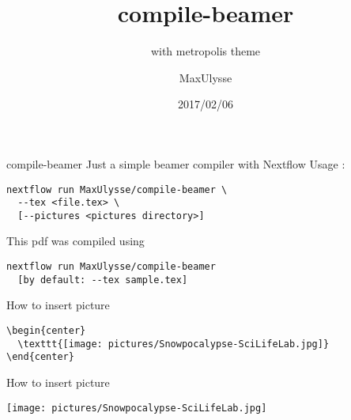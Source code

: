 \documentclass{beamer}
\title{compile-beamer}
\subtitle{with metropolis theme}
\author{MaxUlysse}
\institute{
	SciLifeLab\\
	\vfill\texttt{[image: pictures/SciLifeLab]}
}
\date{2017/02/06}
\begin{document}
\maketitle

\begin{frame}[fragile]{compile-beamer}
  Just a simple beamer compiler with Nextflow
  Usage :
  \begin{verbatim}
nextflow run MaxUlysse/compile-beamer \
  --tex <file.tex> \
  [--pictures <pictures directory>]
  \end{verbatim}
  This pdf was compiled using
  \begin{verbatim}
nextflow run MaxUlysse/compile-beamer
  [by default: --tex sample.tex]
  \end{verbatim}
\end{frame}

\begin{frame}[fragile]{How to insert picture}
  \begin{verbatim}
\begin{center}
  \texttt{[image: pictures/Snowpocalypse-SciLifeLab.jpg]}
\end{center}
  \end{verbatim}
\end{frame}

\begin{frame}{How to insert picture}
  \begin{center}
    \texttt{[image: pictures/Snowpocalypse-SciLifeLab.jpg]}
  \end{center}
\end{frame}
\end{document}
